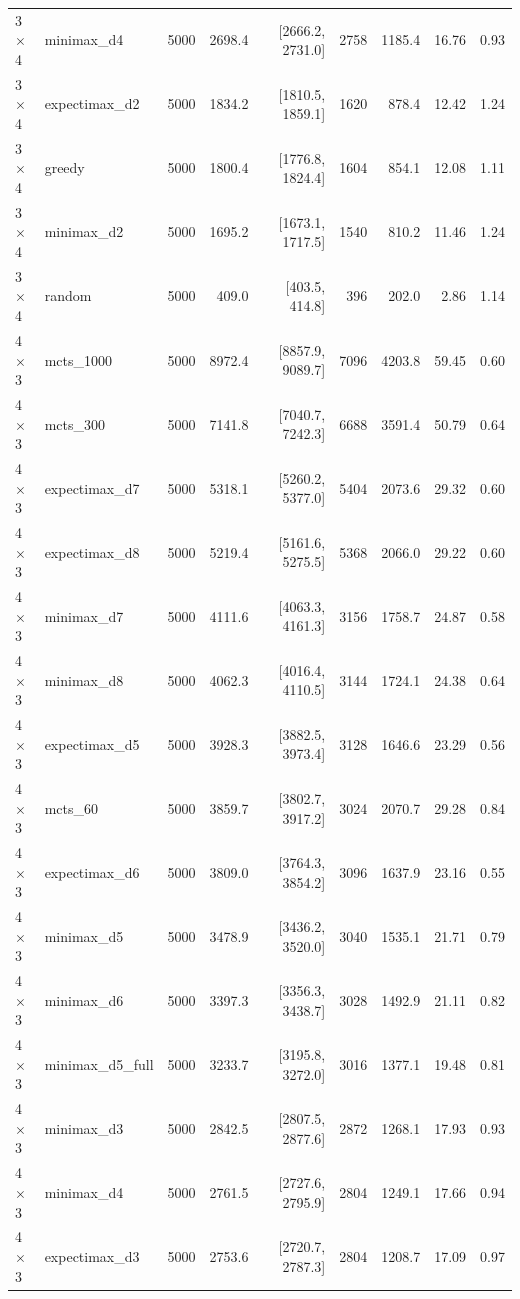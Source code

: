 {\begin{longtable}{llrrrrrrr}
3$\times$4 & minimax\_d4 & 5000 & 2698.4 & [2666.2, 2731.0] & 2758 & 1185.4 & 16.76 & 0.93 \\
3$\times$4 & expectimax\_d2 & 5000 & 1834.2 & [1810.5, 1859.1] & 1620 & 878.4 & 12.42 & 1.24 \\
3$\times$4 & greedy & 5000 & 1800.4 & [1776.8, 1824.4] & 1604 & 854.1 & 12.08 & 1.11 \\
3$\times$4 & minimax\_d2 & 5000 & 1695.2 & [1673.1, 1717.5] & 1540 & 810.2 & 11.46 & 1.24 \\
3$\times$4 & random & 5000 & 409.0 & [403.5, 414.8] & 396 & 202.0 & 2.86 & 1.14 \\
\midrule
4$\times$3 & mcts\_1000 & 5000 & 8972.4 & [8857.9, 9089.7] & 7096 & 4203.8 & 59.45 & 0.60 \\
4$\times$3 & mcts\_300 & 5000 & 7141.8 & [7040.7, 7242.3] & 6688 & 3591.4 & 50.79 & 0.64 \\
4$\times$3 & expectimax\_d7 & 5000 & 5318.1 & [5260.2, 5377.0] & 5404 & 2073.6 & 29.32 & 0.60 \\
4$\times$3 & expectimax\_d8 & 5000 & 5219.4 & [5161.6, 5275.5] & 5368 & 2066.0 & 29.22 & 0.60 \\
4$\times$3 & minimax\_d7 & 5000 & 4111.6 & [4063.3, 4161.3] & 3156 & 1758.7 & 24.87 & 0.58 \\
4$\times$3 & minimax\_d8 & 5000 & 4062.3 & [4016.4, 4110.5] & 3144 & 1724.1 & 24.38 & 0.64 \\
4$\times$3 & expectimax\_d5 & 5000 & 3928.3 & [3882.5, 3973.4] & 3128 & 1646.6 & 23.29 & 0.56 \\
4$\times$3 & mcts\_60 & 5000 & 3859.7 & [3802.7, 3917.2] & 3024 & 2070.7 & 29.28 & 0.84 \\
4$\times$3 & expectimax\_d6 & 5000 & 3809.0 & [3764.3, 3854.2] & 3096 & 1637.9 & 23.16 & 0.55 \\
4$\times$3 & minimax\_d5 & 5000 & 3478.9 & [3436.2, 3520.0] & 3040 & 1535.1 & 21.71 & 0.79 \\
4$\times$3 & minimax\_d6 & 5000 & 3397.3 & [3356.3, 3438.7] & 3028 & 1492.9 & 21.11 & 0.82 \\
4$\times$3 & minimax\_d5\_full & 5000 & 3233.7 & [3195.8, 3272.0] & 3016 & 1377.1 & 19.48 & 0.81 \\
4$\times$3 & minimax\_d3 & 5000 & 2842.5 & [2807.5, 2877.6] & 2872 & 1268.1 & 17.93 & 0.93 \\
4$\times$3 & minimax\_d4 & 5000 & 2761.5 & [2727.6, 2795.9] & 2804 & 1249.1 & 17.66 & 0.94 \\
4$\times$3 & expectimax\_d3 & 5000 & 2753.6 & [2720.7, 2787.3] & 2804 & 1208.7 & 17.09 & 0.97 \\

\end{longtable}}
